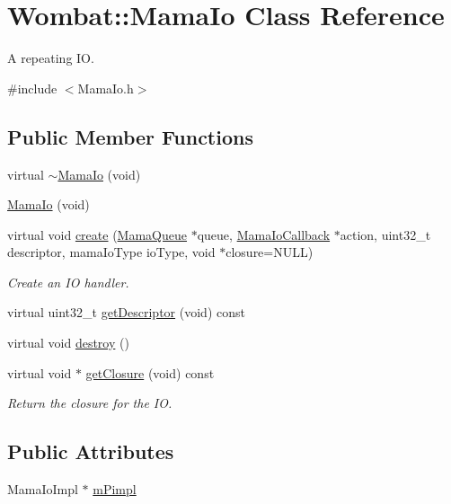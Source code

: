 \hypertarget{classWombat_1_1MamaIo}{
\section{Wombat::MamaIo Class Reference}
\label{classWombat_1_1MamaIo}
}


A repeating IO.  


{\ttfamily \#include $<$MamaIo.h$>$}\subsection*{Public Member Functions}
\begin{DoxyCompactItemize}
\item 
virtual \hyperlink{classWombat_1_1MamaIo_a18619247440895bb19f501a1ae684e2a}{$\sim$MamaIo} (void)
\item 
\hyperlink{classWombat_1_1MamaIo_a2cf2edfb84150714cff618a6c31fb301}{MamaIo} (void)
\item 
virtual void \hyperlink{classWombat_1_1MamaIo_a606eb8a0ecf125a55e0a21a2ebe067b7}{create} (\hyperlink{classWombat_1_1MamaQueue}{MamaQueue} $\ast$queue, \hyperlink{classWombat_1_1MamaIoCallback}{MamaIoCallback} $\ast$action, uint32\_\-t descriptor, mamaIoType ioType, void $\ast$closure=NULL)
\begin{DoxyCompactList}\small\item\em Create an IO handler. \item\end{DoxyCompactList}\item 
virtual uint32\_\-t \hyperlink{classWombat_1_1MamaIo_a96c2bdf130a5310e3b71b142046a7d81}{getDescriptor} (void) const 
\item 
virtual void \hyperlink{classWombat_1_1MamaIo_aa33749a83f1121376dfac0dc4ae7719c}{destroy} ()
\item 
virtual void $\ast$ \hyperlink{classWombat_1_1MamaIo_a34bf1ef81f30d830aa3b000d9fef29fd}{getClosure} (void) const 
\begin{DoxyCompactList}\small\item\em Return the closure for the IO. \item\end{DoxyCompactList}\end{DoxyCompactItemize}
\subsection*{Public Attributes}
\begin{DoxyCompactItemize}
\item 
MamaIoImpl $\ast$ \hyperlink{classWombat_1_1MamaIo_af24af9208dd5bb80f81ccd089f8bd6ac}{mPimpl}
\end{DoxyCompactItemize}


